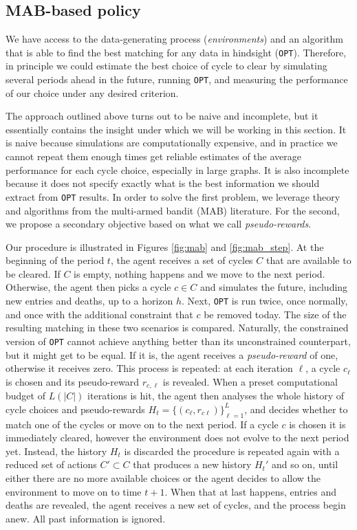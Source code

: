 \documentclass[format=acmsmall, review=false]{acmart}
\begin{document}
\subsection{MAB-based policy}

We have access to the data-generating process (\emph{environments}) and an algorithm that is able to find the best matching for any data in hindsight (\texttt{OPT}). Therefore, in principle we could estimate the best choice of cycle to clear by simulating several periods ahead in the future, running \texttt{OPT}, and measuring the performance of our choice under any desired criterion. 

The approach outlined above turns out to be naive and incomplete, but it essentially contains the insight under which we will be working in this section. It is naive because simulations are computationally expensive, and in practice we cannot repeat them enough times get reliable estimates of the average performance for each cycle choice, especially in large graphs. It is also incomplete because it does not specify exactly what is the best information we should extract from \texttt{OPT} results. In order to solve the first problem, we leverage theory and algorithms from the multi-armed bandit (MAB) literature. For the second, we propose a secondary objective based on what we call \emph{pseudo-rewards}.

Our procedure is illustrated in Figures \ref{fig:mab} and \ref{fig:mab_step}. At the beginning of the period $t$, the agent receives a set of cycles $C$ that are available to be cleared. If $C$ is empty, nothing happens and we move to the next period. Otherwise, the agent then picks a cycle $c \in C$ and simulates the future, including new entries and deaths, up to a horizon $h$. Next, \texttt{OPT} is run twice, once normally, and once with the additional constraint that $c$ be removed today. The size of the resulting matching in these two scenarios is compared. Naturally, the constrained version of \texttt{OPT} cannot achieve anything better than its unconstrained counterpart, but it might get to be equal. If it is, the agent receives a \emph{pseudo-reward} of one, otherwise it receives zero. This process is repeated: at each iteration $\ell$, a cycle $c_{\ell}$ is chosen and its pseudo-reward $r_{c, \ell}$ is revealed. When a preset computational budget of $L(|C|)$ iterations is hit, the agent then analyses the whole history of cycle choices and pseudo-rewards $H_{t} = \{ (c_{\ell}, r_{c\ell} ) \}_{\ell=1}^{L}$, and decides whether to match one of the cycles or move on to the next period. If a cycle $c$ is chosen it is immediately cleared, however the environment does not evolve to the next period yet. Instead, the history $H_t$ is discarded the procedure is repeated again with a reduced set of actions $C' \subset C$ that produces a new history $H_t'$ and so on, until either there are no more available choices or the agent decides to allow the environment to move on to time $t+1$. When that at last happens, entries and deaths are revealed, the agent receives a new set of cycles, and the process begin anew. All past information is ignored.
\end{document}
